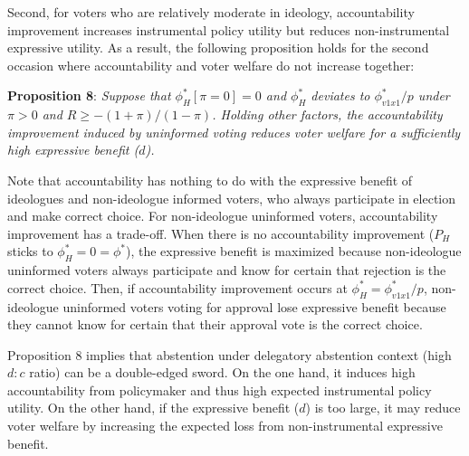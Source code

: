 \documentclass[letterpaper, 12pt]{article}
\begin{document}
    \par Second, for voters who are relatively moderate in ideology, accountability improvement increases instrumental policy utility but reduces non-instrumental expressive utility. As a result, the following proposition holds for the second occasion where accountability and voter welfare do not increase together:
    
    \noindent \textbf{Proposition 8}: \textit{Suppose that $\phi^*_H[\pi=0]=0$ and $\phi^*_H$ deviates to $\phi^*_{v1x1}/p$ under $\pi>0$ and $R \geq - (1+\pi)/(1-\pi)$. Holding other factors, the accountability improvement induced by uninformed voting reduces voter welfare for a sufficiently high expressive benefit ($d$).}
    
    \noindent Note that accountability has nothing to do with the expressive benefit of ideologues and non-ideologue informed voters, who always participate in election and make correct choice. For non-ideologue uninformed voters, accountability improvement has a trade-off. When there is no accountability improvement ($P_H$ sticks to $\phi^*_H=0=\phi^*$), the expressive benefit is maximized because non-ideologue uninformed voters always participate and know for certain that rejection is the correct choice. Then, if accountability improvement occurs at  $\phi^*_H=\phi^*_{v1x1}/p$, non-ideologue uninformed voters voting for approval lose expressive benefit because they cannot know for certain that their approval vote is the correct choice.
    
    \par Proposition 8 implies that abstention under delegatory abstention context (high $d:c$ ratio) can be a double-edged sword. On the one hand, it induces high accountability from policymaker and thus high expected instrumental policy utility. On the other hand, if the expressive benefit ($d$) is too large, it may reduce voter welfare by increasing the expected loss from non-instrumental expressive benefit. 
\end{document}
